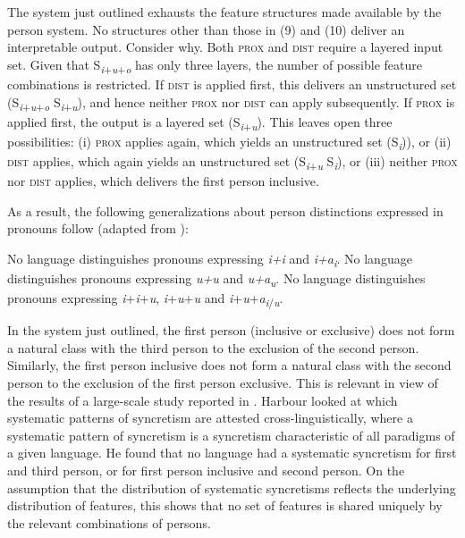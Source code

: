 \documentclass[output=paper]{langsci/langscibook}
\begin{document}
The system just outlined exhausts the feature structures made available by the person system. No structures other than those in (9) and (10) deliver an interpretable output. Consider why. Both \textsc{prox} and \textsc{dist} require a layered input set. Given that S\textit{\textsubscript{i}}\textsubscript{+}\textit{\textsubscript{u}}\textsubscript{+}\textit{\textsubscript{o}} has only three layers, the number of possible feature combinations is restricted. If \textsc{dist} is applied first, this delivers an unstructured set (S\textit{\textsubscript{i}}\textsubscript{+}\textit{\textsubscript{u}}\textsubscript{+}\textit{\textsubscript{o}} \textminus{} S\textit{\textsubscript{i}}\textsubscript{+}\textit{\textsubscript{u}}), and hence neither \textsc{prox} nor \textsc{dist} can apply subsequently. If \textsc{prox} is applied first, the output is a layered set (S\textit{\textsubscript{i}}\textsubscript{+}\textit{\textsubscript{u}}). This leaves open three possibilities: (i) \textsc{prox} applies again, which yields an unstructured set (S\textit{\textsubscript{i}})), or (ii) \textsc{dist} applies, which again yields an unstructured set (S\textit{\textsubscript{i}}\textsubscript{+}\textit{\textsubscript{u}} \textminus{} S\textit{\textsubscript{i}}), or (iii) neither \textsc{prox} nor \textsc{dist} applies, which delivers the first person inclusive.

As a result, the following generalizations about person distinctions expressed in pronouns follow (adapted from \citealt{Bobaljik2008Missing}):

\ea 
    \ea  No language distinguishes pronouns expressing \textit{i+i} and \textit{i+a\textsubscript{i}}.
    \ex No language distinguishes pronouns expressing \textit{u+u} and \textit{u+a\textsubscript{u}}.
    \ex No language distinguishes pronouns expressing \textit{i}+\textit{i}+\textit{u}, \textit{i}+\textit{u}+\textit{u} and \textit{i}+\textit{u}+\textit{a\textsubscript{i}}\textsubscript{/}\textit{\textsubscript{u}}.
    \z
\z



In the system just outlined, the first person (inclusive or exclusive) does not form a natural class with the third person to the exclusion of the second person. Similarly, the first person inclusive does not form a natural class with the second person to the exclusion of the first person exclusive. This is relevant in view of the results of a large-scale study reported in \citet{Harbour2016}. Harbour looked at which systematic patterns of syncretism are attested cross-linguistically, where a systematic pattern of syncretism is a syncretism characteristic of all paradigms of a given language. He found that no language had a systematic syncretism for first and third person, or for first person inclusive and second person. On the assumption that the distribution of systematic syncretisms reflects the underlying distribution of features, this shows that no set of features is shared uniquely by the relevant combinations of persons.
\end{document}

